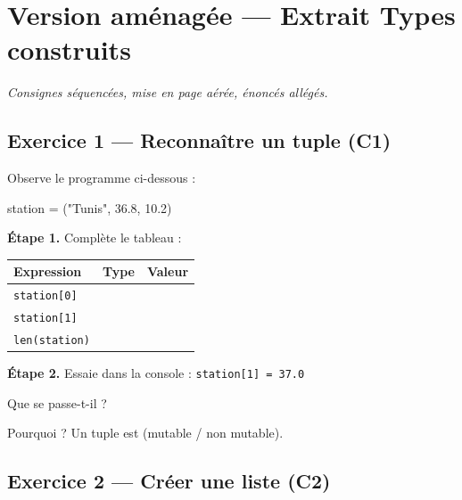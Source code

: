 \section*{Version aménagée --- Extrait Types construits}
\textit{Consignes séquencées, mise en page aérée, énoncés allégés.}

\bigskip

\subsection*{Exercice 1 --- Reconnaître un tuple (C1)}

Observe le programme ci-dessous :

\begin{python}
station = ("Tunis", 36.8, 10.2)
\end{python}

\bigskip

\textbf{Étape 1.} Complète le tableau :

\bigskip

\begin{center}
\begin{tabular}{|l|c|c|}
\hline
\textbf{Expression} & \textbf{Type} & \textbf{Valeur} \\
\hline
\lstinline{station[0]} & \dotfill & \dotfill \\
\hline
\lstinline{station[1]} & \dotfill & \dotfill \\
\hline
\lstinline{len(station)} & \dotfill & \dotfill \\
\hline
\end{tabular}
\end{center}

\bigskip

\textbf{Étape 2.} Essaie dans la console : \lstinline{station[1] = 37.0}

\medskip
Que se passe-t-il ? \dotfill

\medskip
Pourquoi ? Un tuple est \dotfill (mutable / non mutable).

\bigskip
\bigskip

\subsection*{Exercice 2 --- Créer une liste (C2)}

